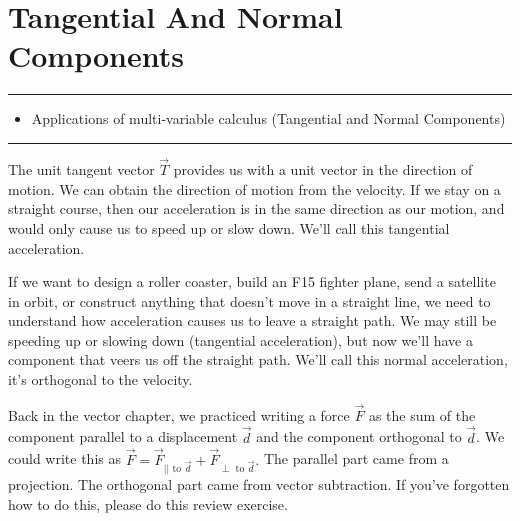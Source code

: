 \documentclass[10pt,]{book}
\theoremstyle{plain}
\theoremstyle{definition}
\theoremstyle{definition}
\theoremstyle{definition}
\theoremstyle{definition}
\newenvironment{objectives}[1]{\noindent\rule{\linewidth}{0.1ex}\newline{\textbf{{\large#1}}\par\smallskip}}{\par\noindent\rule{\linewidth}{0.1ex}\par\smallskip}
\theoremstyle{definition}
\numberwithin{equation}{section}
\begin{document}
\typeout{************************************************}
\typeout{************************************************}
\section[{Tangential And Normal Components}]{Tangential And Normal Components}\label{ch08_05_t_n_applications}
\begin{objectives}{Objectives}\label{objectives-20}
%
\begin{itemize}[label=\textbullet]
\item{}Applications of multi-variable calculus (Tangential and Normal Components)%
\end{itemize}
\end{objectives}
The unit tangent vector \(\vec T\) provides us with a unit vector in the direction of motion. We can obtain the direction of motion from the velocity. If we stay on a straight course, then our acceleration is in the same direction as our motion, and would only cause us to speed up or slow down. We'll call this tangential acceleration.%
\par
If we want to design a roller coaster, build an F15 fighter plane, send a satellite in orbit, or construct anything that doesn't move in a straight line, we need to understand how acceleration causes us to leave a straight path. We may still be speeding up or slowing down (tangential acceleration), but now we'll have a component that veers us off the straight path. We'll call this normal acceleration, it's orthogonal to the velocity.%
\par
Back in the vector chapter, we practiced writing a force \(\vec F\) as the sum of the component parallel to a displacement \(\vec d\) and the component orthogonal to \(\vec d\). We could write this as \(\vec F = \vec F_{|| \text{ to } \vec d} + \vec F_{\perp \text{ to } \vec d}.\) The parallel part came from a projection. The orthogonal part came from vector subtraction. If you've forgotten how to do this, please do this review exercise.%
\end{document}
